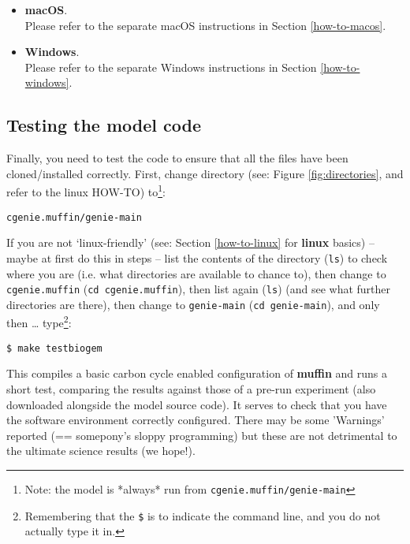 \documentclass[11pt,fleqn]{book} %
\begin{document}
\begin{itemize}
\vspace{1mm}
\item \textbf{macOS}. 
\vspace{1mm}
\\ Please refer to the separate macOS instructions in Section \ref{how-to-macos}.

\vspace{1mm}
\item \textbf{Windows}. 
\vspace{1mm}
\\ Please refer to the separate Windows instructions in Section \ref{how-to-windows}.

\end{itemize}


\subsection{Testing the model code}

\noindent Finally, you need to test the code to ensure that all the files have been cloned/installed correctly.
 First, change directory (see: Figure \ref{fig:directories}, and refer to the linux HOW-TO) to\footnote{Note: the model is *always* run from \texttt{cgenie.muffin/genie-main}}:
\vspace{-2mm}
\begin{verbatim}
cgenie.muffin/genie-main
\end{verbatim}
\vspace{-2mm}

\noindent If you are not ‘linux-friendly’ (see: Section \ref{how-to-linux} for \textbf{linux} basics) – maybe at first do this in steps – list the contents of the directory (\texttt{ls}) to check where you are (i.e. what directories are available to chance to), then change to \texttt{cgenie.muffin} (\texttt{cd cgenie.muffin}), then list again (\texttt{ls}) (and see what further directories are there), then change to \texttt{genie-main} (\texttt{cd genie-main}), and only then … type\footnote{Remembering that the \texttt{\$} is to indicate the command line, and you do not actually type it in.}:
\vspace{-2mm}
\begin{verbatim}
$ make testbiogem
\end{verbatim}
\vspace{-2mm}

\noindent This compiles a basic carbon cycle enabled configuration of \textbf{muffin} and runs a short test, comparing the results against those of a pre-run experiment (also downloaded alongside the model source code). It serves to check that you have the software environment correctly configured. There may be some ’Warnings’ reported (== somepony’s sloppy programming) but these are not detrimental to the ultimate science results (we hope!).
\end{document}
